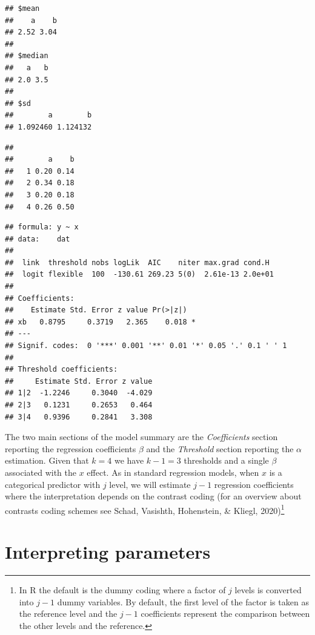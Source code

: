\documentclass[
  man,floatsintext]{apa6}
\begin{document}
\normalsize

\scriptsize

\begin{verbatim}
## $mean
##    a    b 
## 2.52 3.04 
## 
## $median
##   a   b 
## 2.0 3.5 
## 
## $sd
##        a        b 
## 1.092460 1.124132
\end{verbatim}

\begin{verbatim}
##    
##        a    b
##   1 0.20 0.14
##   2 0.34 0.18
##   3 0.20 0.18
##   4 0.26 0.50
\end{verbatim}

\normalsize

\scriptsize

\begin{verbatim}
## formula: y ~ x
## data:    dat
## 
##  link  threshold nobs logLik  AIC    niter max.grad cond.H 
##  logit flexible  100  -130.61 269.23 5(0)  2.61e-13 2.0e+01
## 
## Coefficients:
##    Estimate Std. Error z value Pr(>|z|)  
## xb   0.8795     0.3719   2.365    0.018 *
## ---
## Signif. codes:  0 '***' 0.001 '**' 0.01 '*' 0.05 '.' 0.1 ' ' 1
## 
## Threshold coefficients:
##     Estimate Std. Error z value
## 1|2  -1.2246     0.3040  -4.029
## 2|3   0.1231     0.2653   0.464
## 3|4   0.9396     0.2841   3.308
\end{verbatim}

\normalsize

The two main sections of the model summary are the \emph{Coefficients} section reporting the regression coefficients \(\beta\) and the \emph{Threshold} section reporting the \(\alpha\) estimation. Given that \(k = 4\) we have \(k - 1 = 3\) thresholds and a single \(\beta\) associated with the \(x\) effect. As in standard regression models, when \(x\) is a categorical predictor with \(j\) level, we will estimate \(j - 1\) regression coefficients where the interpretation depends on the contrast coding (for an overview about contrasts coding schemes see Schad, Vasishth, Hohenstein, \& Kliegl, 2020)\footnote{In R the default is the dummy coding where a factor of \(j\) levels is converted into \(j - 1\) dummy variables. By default, the first level of the factor is taken as the reference level and the \(j - 1\) coefficients represent the comparison between the other levels and the reference.}

\section{Interpreting parameters}\label{interpreting-parameters}
\end{document}

